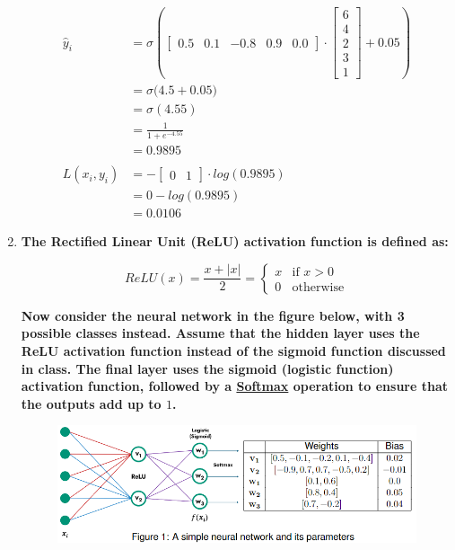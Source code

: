 \documentclass[a4paper]{article}
\begin{document}
\begin{sloppypar}
\begin{enumerate}[start=1,label=Q\arabic*,left=0pt]
    \begin{align*}
        \hat{y}_i &=  \sigma\left(\begin{bmatrix}0.5 & 0.1 & -0.8 & 0.9 & 0.0\end{bmatrix} \cdot \begin{bmatrix} 6 \\ 4 \\ 2 \\ 3 \\ 1 \end{bmatrix} + 0.05\right) \\
        &= \sigma\Big(4.5 + 0.05\Big) \\
        &= \sigma(4.55) \\
        &= \frac{1}{1 + e^{-4.55}} \\
        &= 0.9895 \\\\
        L(x_i, y_i) &= -\begin{bmatrix}0 & 1\end{bmatrix} \cdot log(0.9895) \\
        &= 0 -log(0.9895) \\
        &= 0.0106
    \end{align*}
    
    \item \textbf{The Rectified Linear Unit (ReLU) activation function is defined as:}
    
    \[
    ReLU(x) = \frac{x + |x|}{2} = \begin{cases} 
    x & \text{if } x > 0 \\
    0 & \text{otherwise}
    \end{cases}
    \]

    \textbf{Now consider the neural network in the figure below, with 3 possible classes instead.
    Assume that the hidden layer uses the ReLU activation function instead of the sigmoid
    function discussed in class. The final layer uses the sigmoid (logistic function) activation
    function, followed by a \href{https://en.wikipedia.org/wiki/Softmax_function}{Softmax} operation to 
    ensure that the outputs add up to $1$.}

    \begin{figure}[H]
        \centering  
        \includegraphics[height=0.18\textheight]{Q2_NN.png}
        \label{fig:Q2_NN}
    \end{figure}


\end{enumerate}
\end{sloppypar}
\end{document}
